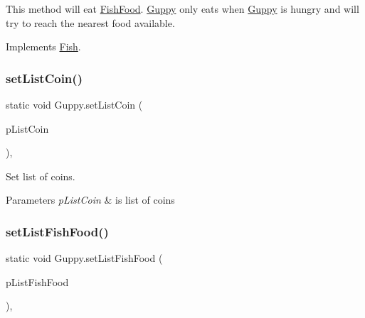 This method will eat \mbox{\hyperlink{class_fish_food}{Fish\+Food}}. \mbox{\hyperlink{class_guppy}{Guppy}} only eats when \mbox{\hyperlink{class_guppy}{Guppy}} is hungry and will try to reach the nearest food available. 

Implements \mbox{\hyperlink{interface_fish_a72d533bdc4ac39f4ffd93d70504efed8}{Fish}}.

\mbox{\label{class_guppy_a46004a42a6bea1e8fce0f26a61351d17}} 
\subsubsection{\texorpdfstring{set\+List\+Coin()}{setListCoin()}}
{\footnotesize\ttfamily static void Guppy.\+set\+List\+Coin (\begin{DoxyParamCaption}\item[{final \mbox{\hyperlink{class_linked_list}{Linked\+List}}$<$ \mbox{\hyperlink{class_coin}{Coin}} $>$}]{p\+List\+Coin }\end{DoxyParamCaption})\hspace{0.3cm}{\ttfamily [inline]}, {\ttfamily [static]}}

Set list of coins.


\begin{DoxyParams}{Parameters}
{\em p\+List\+Coin} & is list of coins \\
\hline
\end{DoxyParams}
\mbox{\label{class_guppy_acc235342cdaa86c847ab01eb55043d7e}} 
\subsubsection{\texorpdfstring{set\+List\+Fish\+Food()}{setListFishFood()}}
{\footnotesize\ttfamily static void Guppy.\+set\+List\+Fish\+Food (\begin{DoxyParamCaption}\item[{final \mbox{\hyperlink{class_linked_list}{Linked\+List}}$<$ \mbox{\hyperlink{class_fish_food}{Fish\+Food}} $>$}]{p\+List\+Fish\+Food }\end{DoxyParamCaption})\hspace{0.3cm}{\ttfamily [inline]}, {\ttfamily [static]}}

